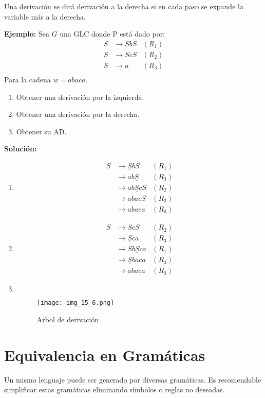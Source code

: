 Una derivación se dirá derivación a la derecha si en cada paso se expande la variable más a la derecha.

\textbf{Ejemplo: }Sea $G$ una GLC donde P está dado por:
\begin{align*}
S	&\rightarrow SbS	&(R_1)	\\
S	&\rightarrow ScS	&(R_2)	\\
S	&\rightarrow a		&(R_3)	\\
\end{align*}
Para la cadena $w=abaca$.
\begin{enumerate}
\item Obtener una derivación por la izquierda.
\item Obtener una derivación por la derecha.
\item Obtener su AD.
\end{enumerate}
\textbf{Solución: }
\begin{enumerate}
\item 
\begin{align*}
S	&\rightarrow \underline{S}bS	&(R_1)\\
	&\rightarrow ab\underline{S}	&(R_3)\\
	&\rightarrow ab\underline{S}cS	&(R_2)\\
	&\rightarrow abacS				&(R_3)\\
	&\rightarrow abaca				&(R_3)
\end{align*}
\item
\begin{align*}
S	&\rightarrow Sc\underline{S}	&(R_2)\\
	&\rightarrow \underline{S}ca	&(R_3)\\
	&\rightarrow Sb\underline{S}ca	&(R_1)\\
	&\rightarrow \underline{S}baca	&(R_3)\\
	&\rightarrow abaca				&(R_3)
\end{align*}
\item $\,$\\
\begin{figure}[h!]
\centering
\texttt{[image: img\_15\_6.png]}
\caption{Arbol de derivación}\label{img_15_6}
\end{figure}
\end{enumerate}
\section{Equivalencia en Gramáticas}
Un mismo lenguaje puede ser generado por diversas gramáticas. Es recomendable simplificar estas gramáticas eliminando símbolos o reglas no deseadas.

